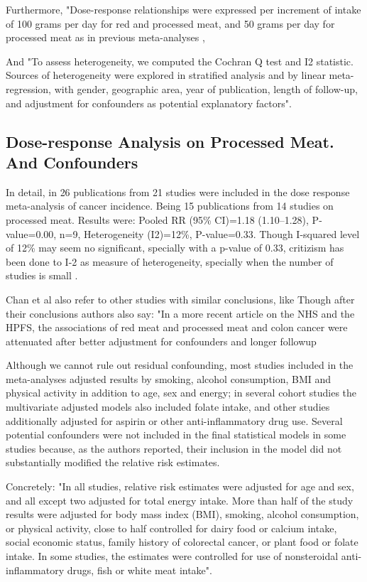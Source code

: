 \documentclass{article}
\begin{document}
Furthermore, "Dose-response relationships were expressed per increment of intake of 100 grams
per day for red and processed meat, and 50 grams per day for processed meat as in previous meta-analyses \cite{aicr}, \cite{sandhu}

And "To assess heterogeneity, we computed the Cochran Q test and I2
statistic. Sources of heterogeneity were explored in stratified
analysis and by linear meta-regression, with gender, geographic
area, year of publication, length of follow-up, and adjustment for
confounders as potential explanatory factors".




\subsection{Dose-response Analysis on Processed Meat. And Confounders}

In detail, in \cite{chan} 26 publications from 21 studies were included in the dose response meta-analysis of cancer incidence. Being 15 publications from 14 studies on processed meat. Results were: Pooled RR (95\% CI)=1.18 (1.10–1.28), P-value=0.00, n=9, Heterogeneity (I2)=12\%, P-value=0.33. Though I-squared level of 12\% may seem no significant, specially with a p-value of 0.33, critizism has been done to I-2 as measure of heterogeneity, specially when the number of studies is small \cite{hippel}.

Chan et al also refer to other studies with similar conclusions, like \cite{aicr,wei2009}
Though after their conclusions authors also say: "In a more recent article on the NHS and the HPFS, the
associations of red meat and processed meat and colon cancer were
attenuated after better adjustment for confounders and longer followup \cite{wei}


Although we cannot rule out residual confounding, most studies
included in the meta-analyses adjusted results by smoking, alcohol
consumption, BMI and physical activity in addition to age, sex and energy; in several
cohort studies the multivariate adjusted models also included folate
intake, and other studies additionally adjusted for
aspirin or other anti-inflammatory drug use. Several
potential confounders were not included in the final statistical
models in some studies because, as the authors reported, their
inclusion in the model did not substantially modified the relative
risk estimates.

Concretely: "In all studies, relative risk estimates were adjusted for age and
sex, and all except two adjusted for total energy intake. More than
half of the study results were adjusted for body mass index (BMI),
smoking, alcohol consumption, or physical activity, close to half
controlled for dairy food or calcium intake, social economic status,
family history of colorectal cancer, or plant food or folate intake.
In some studies, the estimates were controlled for use of nonsteroidal
anti-inflammatory drugs, fish or white meat intake".
\end{document}
